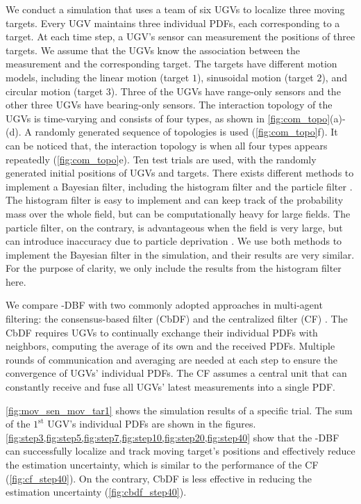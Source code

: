 	We conduct a simulation that uses a team of six UGVs to localize three moving targets.
	Every UGV maintains three individual PDFs, each corresponding to a target.
	At each time step, a UGV's sensor can measurement the positions of three targets.
	We assume that the UGVs know the association between the measurement and the corresponding target.
	The targets have different motion models, including the linear motion (target $1$), sinusoidal motion (target $2$), and circular motion (target $3$).
	Three of the UGVs have range-only sensors and the other three UGVs have bearing-only sensors.
	The interaction topology of the UGVs is time-varying and consists of four types, as shown in \cref{fig:com_topo}(a)-(d).
	A randomly generated sequence of topologies is used (\cref{fig:com_topo}f).
	It can be noticed that, the interaction topology is {\fc} when all four types appears repeatedly (\cref{fig:com_topo}e).
	\textcolor{\revcol}{
	Ten test trials are used, with the randomly generated initial positions of UGVs and targets.	
	There exists different methods to implement a Bayesian filter, including the histogram filter and the particle filter \cite{thrun2005probabilistic}. 
	The histogram filter is easy to implement and can keep track of the probability mass over the whole field, but can be computationally heavy for large fields.
	The particle filter, on the contrary, is advantageous when the field is very large, but can introduce inaccuracy due to particle deprivation \cite{thrun2005probabilistic}.
	We use both methods to implement the Bayesian filter in the simulation, and their results are very similar. 
	For the purpose of clarity, we only include the results from the histogram filter here.}
	
	\textcolor{\revcol}{We compare \proto-DBF with two commonly adopted approaches in multi-agent filtering: the consensus-based filter (CbDF) \cite{olfati2006belief} and the centralized filter (CF) \cite{veeravalli2012distributed}. 
	The CbDF requires UGVs to continually exchange their individual PDFs with neighbors, computing the average of its own and the received PDFs. 
	Multiple rounds of communication and averaging are needed at each step to ensure the convergence of UGVs' individual PDFs. 
	The CF assumes a central unit that can constantly receive and fuse all UGVs' latest measurements into a single PDF.}
	
	\cref{fig:mov_sen_mov_tar1} shows the simulation results of a specific trial.
	The sum of the $1^\text{st}$ UGV's individual PDFs are shown in the figures.
	\cref{fig:step3,fig:step5,fig:step7,fig:step10,fig:step20,fig:step40} show that the \proto-DBF can successfully localize and track moving target's positions and effectively reduce the estimation uncertainty, which is similar to the performance of the CF (\cref{fig:cf_step40}).
	On the contrary, CbDF is less effective in reducing the estimation uncertainty (\cref{fig:cbdf_step40}).
	
